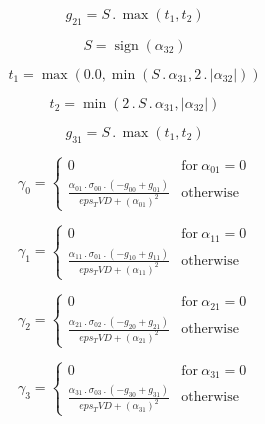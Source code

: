 \documentclass{article}
\begin{document}
\begin{dmath}g_{21} = S \,.\, \max\left(t_{1}, t_{2}\right)\end{dmath}

\begin{dmath}S = \operatorname{sign}{\left (\alpha_{32} \right )}\end{dmath}

\begin{dmath}t_{1} = \max\left(0.0, \min\left(S \,.\, \alpha_{31}, 2 \,.\, \left|{\alpha_{32}}\right|\right)\right)\end{dmath}

\begin{dmath}t_{2} = \min\left(2 \,.\, S \,.\, \alpha_{31}, \left|{\alpha_{32}}\right|\right)\end{dmath}

\begin{dmath}g_{31} = S \,.\, \max\left(t_{1}, t_{2}\right)\end{dmath}

\begin{dmath}\gamma_{0} = \begin{cases} 0 & \text{for}\: \alpha_{01} = 0 \\\frac{\alpha_{01} \,.\, \sigma_{0 0} \,.\, \left(- g_{00} + g_{01}\right)}{eps_TVD + \left(\alpha_{01} \right)^{2}} & \text{otherwise} \end{cases}\end{dmath}

\begin{dmath}\gamma_{1} = \begin{cases} 0 & \text{for}\: \alpha_{11} = 0 \\\frac{\alpha_{11} \,.\, \sigma_{0 1} \,.\, \left(- g_{10} + g_{11}\right)}{eps_TVD + \left(\alpha_{11} \right)^{2}} & \text{otherwise} \end{cases}\end{dmath}

\begin{dmath}\gamma_{2} = \begin{cases} 0 & \text{for}\: \alpha_{21} = 0 \\\frac{\alpha_{21} \,.\, \sigma_{0 2} \,.\, \left(- g_{20} + g_{21}\right)}{eps_TVD + \left(\alpha_{21} \right)^{2}} & \text{otherwise} \end{cases}\end{dmath}

\begin{dmath}\gamma_{3} = \begin{cases} 0 & \text{for}\: \alpha_{31} = 0 \\\frac{\alpha_{31} \,.\, \sigma_{0 3} \,.\, \left(- g_{30} + g_{31}\right)}{eps_TVD + \left(\alpha_{31} \right)^{2}} & \text{otherwise} \end{cases}\end{dmath}
\end{document}

